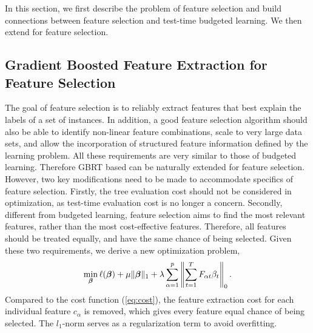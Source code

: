 In this section, we first describe the problem of feature selection and build connections between feature selection and test-time budgeted learning. We then extend \name{} for feature selection.

\subsection{Gradient Boosted Feature Extraction for Feature Selection}
The goal of feature selection is to reliably extract features that best explain the labels of a set of instances. In addition, a good feature selection algorithm should also be able to identify non-linear feature combinations, scale to very large data sets, and allow the incorporation of structured feature information defined by the learning problem. All these requirements are very similar to those of budgeted learning. Therefore GBRT based \name{} can be naturally extended for feature selection. However, two key modifications need to be made to accommodate specifics of feature selection. Firstly, the tree evaluation cost should not be considered in optimization, as test-time evaluation cost is no longer a concern. Secondly, different from budgeted learning, feature selection aims to find the most relevant features, rather than the most cost-effective features. Therefore, all features should be treated equally, and have the same chance of being selected. Given these two requirements, we derive a new optimization problem,
\begin{align}
	\min_{\boldsymbol{\beta}} \ell(\boldsymbol{\beta}) + \mu \|\boldsymbol{\beta}\|_1 + \lambda \sum_{\alpha=1}^p \left\|\sum_{t=1}^T F_{\alpha t} \beta_t\right\|_0. \label{eq:gbfs_original}
\end{align}
Compared to the cost function (\ref{eq:cost}), the feature extraction cost for each individual feature $c_{\alpha}$ is removed, which gives every feature equal chance of being selected. The $l_1$-norm serves as a regularization term to avoid overfitting. 

